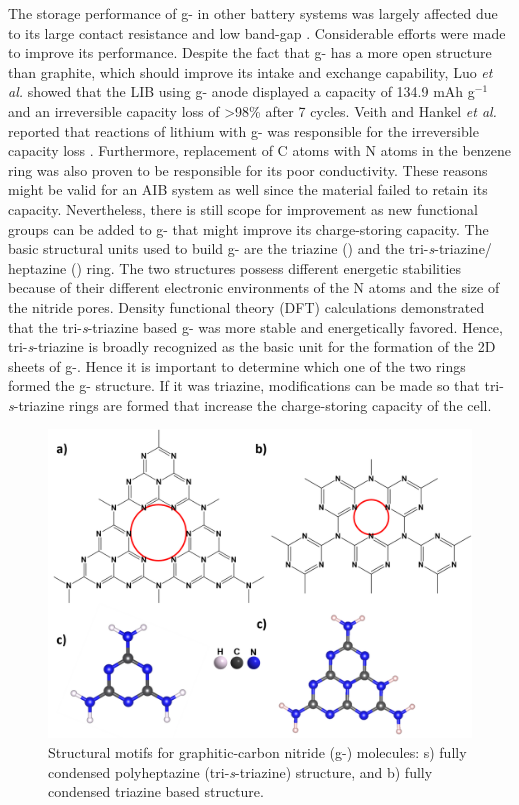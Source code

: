 The storage performance of g- in other battery systems was largely affected due to its large contact resistance and low band-gap \cite{shah_highly_2017}. Considerable efforts were made to improve its performance. Despite the fact that g- has a more open structure than graphite, which should improve its  intake and exchange capability, Luo \cite{luo_graphitic_2019} \textit{et al.} showed that the LIB using g- anode displayed a capacity of 134.9 mAh g$^{-1}$ and an irreversible capacity loss of >98\% after 7 cycles. Veith and Hankel \textit{et al.} reported that reactions of lithium with g- was responsible for the irreversible capacity loss \cite{veith_electrochemical_2013, hankel_lithium_2015}. Furthermore, replacement of C atoms with N atoms in the benzene ring was also proven to be responsible for its poor conductivity. These reasons might be valid for an AIB system as well since the material failed to retain its capacity. Nevertheless, there is still scope for improvement as new functional groups can be added to g- that might improve its charge-storing capacity. The basic structural units used to build g- are the triazine () and the tri-\textit{s}-triazine/ heptazine () ring. The two structures possess different energetic stabilities because of their different electronic environments of the N atoms and the size of the nitride pores. Density functional theory (DFT) calculations demonstrated that the tri-\textit{s}-triazine based g- was more stable and energetically favored. Hence, tri-\textit{s}-triazine is broadly recognized as the basic unit for the formation of the 2D sheets of g-. Hence it is important to determine which one of the two rings formed the g- structure. If it was triazine, modifications can be made so that tri-\textit{s}-triazine rings are formed that increase the charge-storing capacity of the cell. 

\begin{figure}[th!]
\centering
\includegraphics[width=\textwidth]{Figures/chap6fig/c3n4}
\caption{Structural motifs for graphitic-carbon nitride (g-) molecules: s) fully condensed polyheptazine (tri-\textit{s}-triazine)  structure, and b) fully condensed triazine based  structure.}
\label{Figures/chap6fig:c3n4}
\end{figure}

